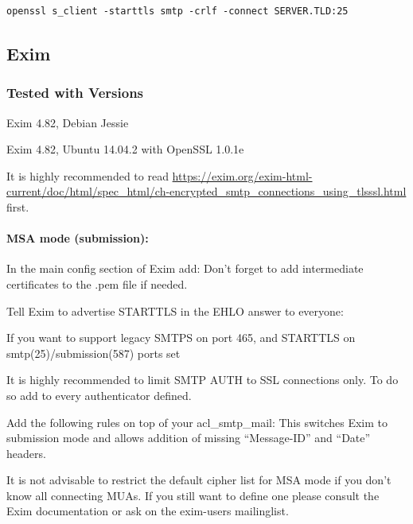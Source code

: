 \begin{lstlisting}
openssl s_client -starttls smtp -crlf -connect SERVER.TLD:25
\end{lstlisting}


\subsection{Exim}

\subsubsection{Tested with Versions}
\begin{itemize*}
  \item Exim 4.82, Debian Jessie
  \item Exim 4.82, Ubuntu 14.04.2 with OpenSSL 1.0.1e
\end{itemize*}


It is highly recommended to read
\url{https://exim.org/exim-html-current/doc/html/spec_html/ch-encrypted_smtp_connections_using_tlsssl.html}
first.

\paragraph{MSA mode (submission):}
In the main config section of Exim add:
Don't forget to add intermediate certificates to the .pem file if needed.

Tell Exim to advertise STARTTLS in the EHLO answer to everyone:

If you want to support legacy SMTPS on port 465, and STARTTLS on smtp(25)/submission(587) ports set

It is highly recommended to limit SMTP AUTH to SSL connections only. To do so add
to every authenticator defined.

Add the following rules on top of your acl\_smtp\_mail:
This switches Exim to submission mode and allows addition of missing ``Message-ID'' and ``Date'' headers.

It is not advisable to restrict the default cipher list for MSA mode if you don't know all connecting MUAs. If you still want to define one please consult the Exim documentation or ask on the exim-users mailinglist.


